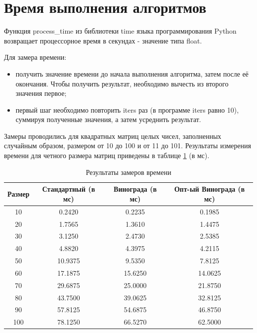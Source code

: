 \section{Время выполнения алгоритмов}

Функция process\_time из библиотеки time языка программирования Python возвращает  процессорное время в секундах - значение типа float.

Для замера времени:
\begin{itemize}
	\item получить значение времени до начала выполнения алгоритма, затем после её окончания. Чтобы получить результат, необходимо вычесть из второго значения первое;
	\item первый шаг необходимо повторить iters раз (в программе iters равно 10), суммируя полученные значения, а затем усреднить результат.
\end{itemize}

Замеры проводились для квадратных матриц целых чисел, заполненных случайным образом, размером от 10 до 100 и от 11 до 101. Результаты измерения времени для четного размера матриц приведены в таблице \ref{tbl:time_even} (в мс).

\begin{table}[h]
    \begin{center}
        \begin{threeparttable}
        \captionsetup{justification=raggedright,singlelinecheck=off}
        \caption{Результаты замеров времени}
        \label{tbl:time_even}
        \begin{tabular}{|c|c|c|c|}
            \hline
            Размер & Стандартный (в мс) & Винограда (в мс) & Опт-ый Винограда (в мс)  \\
            \hline
		    10 & 0.2420 & 0.2235 & 0.1985 \\ 
		    \hline
		    20 & 1.7565 & 1.3610 & 1.4475 \\ 
		    \hline
		    30 & 3.1250 & 2.4730 & 2.5385 \\ 
		    \hline
		    40 & 4.8820 & 4.3975 & 4.2115 \\ 
		    \hline
		    50 & 10.9375 & 9.5350 & 7.8125 \\ 
		    \hline
		    60 & 17.1875 & 15.6250 & 14.0625 \\ 
		    \hline
		    70 & 29.6875 & 25.0000 & 21.8750 \\ 
		    \hline
		    80 & 43.7500 & 39.0625 & 32.8125 \\ 
		    \hline
		    90 & 57.8125 & 54.6875 & 46.8750 \\ 
		    \hline
		    100 & 78.1250 & 66.5270 & 62.5000 \\ 
		    \hline
		\end{tabular}
    \end{threeparttable}
\end{center}
\end{table}


